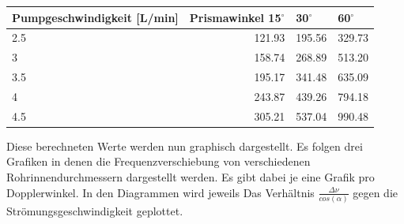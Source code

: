 \documentclass[titlepage=firstcover, captions=tableheading]{scrartcl}
\begin{document}
        \begin{minipage}{\linewidth}
            \begin{table}[H]
                \centering
            
            \begin{tabular}{lrll}
                \toprule
                Pumpgeschwindigkeit [L/min] & Prismawinkel 15$^{\circ}$ & 30$^{\circ}$ & 60$^{\circ}$ \\
                \midrule
                2.5   & 121.93 & 195.56 & 329.73 \\ 
                3     & 158.74 & 268.89 & 513.20  \\ 
                3.5   & 195.17 & 341.48 & 635.09 \\ 
                4     & 243.87 & 439.26 & 794.18  \\
                4.5   & 305.21 & 537.04 & 990.48  \\    
                \bottomrule
                
            \end{tabular}
            \label{tab:6}
            \end{table}
            \end{minipage}

\noindent Diese berechneten Werte werden nun graphisch dargestellt. Es folgen drei Grafiken in denen die Frequenzverschiebung von verschiedenen Rohrinnendurchmessern dargestellt werden. Es gibt dabei je eine Grafik pro Dopplerwinkel. In den Diagrammen wird jeweils Das Verhältnis $\frac{\Delta \nu }{cos(\alpha)}$ gegen die Strömungsgeschwindigkeit geplottet.
\end{document}
